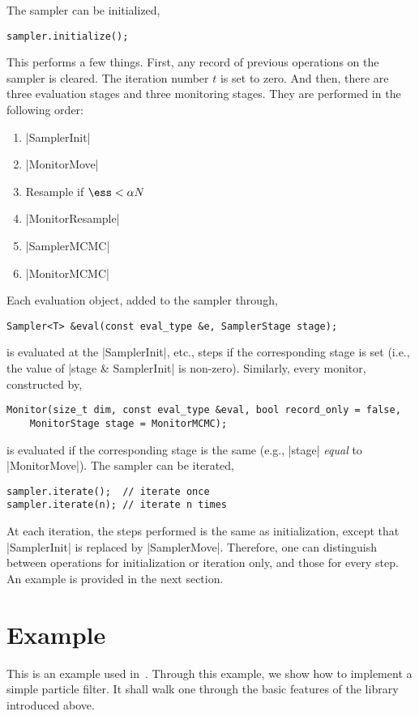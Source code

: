 The sampler can be initialized,
\begin{verbatim}
sampler.initialize();
\end{verbatim}
This performs a few things. First, any record of previous operations on the
sampler is cleared. The iteration number $t$ is set to zero. And then, there
are three evaluation stages and three monitoring stages. They are performed in
the following order:

\begin{enumerate}
  \item |SamplerInit|
  \item |MonitorMove|
  \item Resample if $\ess < \alpha N$
  \item |MonitorResample|
  \item |SamplerMCMC|
  \item |MonitorMCMC|
\end{enumerate}

Each evaluation object, added to the sampler through,
\begin{verbatim}
Sampler<T> &eval(const eval_type &e, SamplerStage stage);
\end{verbatim}
is evaluated at the |SamplerInit|, etc., steps if the corresponding stage is
set (i.e., the value of |stage & SamplerInit| is non-zero). Similarly, every
monitor, constructed by,
\begin{verbatim}
Monitor(size_t dim, const eval_type &eval, bool record_only = false,
    MonitorStage stage = MonitorMCMC);
\end{verbatim}
is evaluated if the corresponding stage is the same (e.g., |stage| \emph{equal}
to |MonitorMove|). The sampler can be iterated,
\begin{verbatim}
sampler.iterate();  // iterate once
sampler.iterate(n); // iterate n times
\end{verbatim}
At each iteration, the steps performed is the same as initialization, except
that |SamplerInit| is replaced by |SamplerMove|. Therefore, one can distinguish
between operations for initialization or iteration only, and those for every
step. An example is provided in the next section.

\section{Example}
\label{sec:Example (PF)}

This is an example used in~\cite{Johansen:2009wd}. Through this example, we
show how to implement a simple particle filter. It shall walk one through the
basic features of the library introduced above.

